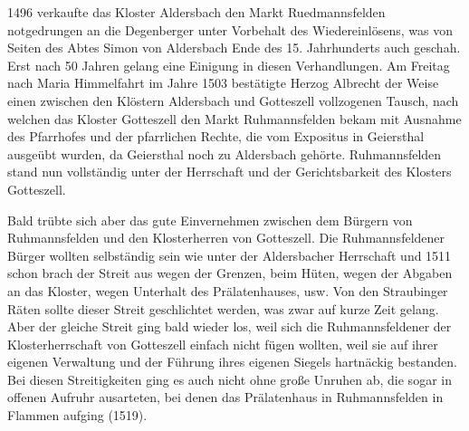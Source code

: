 \documentclass[12pt,a4paper]{book}
\begin{document}
1496 verkaufte das Kloster Aldersbach den Markt Ruedmannsfelden notgedrungen an
die Degenberger unter Vorbehalt des Wiedereinlösens, was von Seiten des Abtes
Simon von Aldersbach Ende des 15. Jahrhunderts auch geschah. Erst nach 50 Jahren
gelang eine Einigung in diesen Verhandlungen. Am Freitag nach Maria Himmelfahrt
im Jahre 1503 bestätigte Herzog Albrecht der Weise einen zwischen den Klöstern
Aldersbach und Gotteszell vollzogenen Tausch, nach welchen das Kloster
Gotteszell den Markt Ruhmannsfelden bekam mit Ausnahme des Pfarrhofes und der
pfarrlichen Rechte, die vom Expositus in Geiersthal ausgeübt wurden, da
Geiersthal noch zu Aldersbach gehörte. Ruhmannsfelden stand nun vollständig
unter der Herrschaft und der Gerichtsbarkeit des Klosters Gotteszell.

Bald trübte sich aber das gute Einvernehmen zwischen dem Bürgern von
Ruhmannsfelden und den Klosterherren von Gotteszell. Die Ruhmannsfeldener Bürger
wollten selbständig sein wie unter der Aldersbacher Herrschaft und 1511 schon
brach der Streit aus wegen der Grenzen, beim Hüten, wegen der Abgaben an das
Kloster, wegen Unterhalt des Prälatenhauses, usw. Von den Straubinger Räten
sollte dieser Streit geschlichtet werden, was zwar auf kurze Zeit gelang. Aber
der gleiche Streit ging bald wieder los, weil sich die Ruhmannsfeldener der
Klosterherrschaft von Gotteszell einfach nicht fügen wollten, weil sie auf ihrer
eigenen Verwaltung und der Führung ihres eigenen Siegels hartnäckig bestanden.
Bei diesen Streitigkeiten ging es auch nicht ohne große Unruhen ab, die sogar in
offenen Aufruhr ausarteten, bei denen das Prälatenhaus in Ruhmannsfelden in
Flammen aufging (1519).
\end{document}
